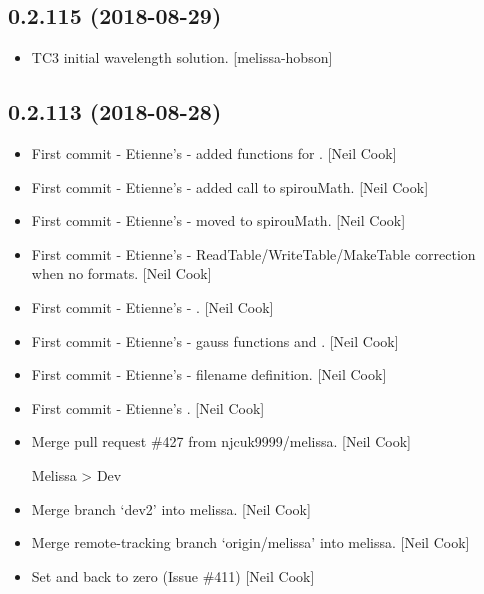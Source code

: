 \documentclass[a4paper,10pt,english]{report}
\begin{document}
\subsection{0.2.115 (2018-08-29)}
\label{\detokenize{misc/changelog:id346}}\begin{itemize}
\item {} 
TC3 initial wavelength solution. {[}melissa-hobson{]}

\end{itemize}


\subsection{0.2.113 (2018-08-28)}
\label{\detokenize{misc/changelog:id347}}\begin{itemize}
\item {} 
First commit - Etienne’s  - added functions for . {[}Neil
Cook{]}

\item {} 
First commit - Etienne’s  - added call to spirouMath. {[}Neil
Cook{]}

\item {} 
First commit - Etienne’s  - moved  to spirouMath. {[}Neil
Cook{]}

\item {} 
First commit - Etienne’s  - ReadTable/WriteTable/MakeTable
correction when no formats. {[}Neil Cook{]}

\item {} 
First commit - Etienne’s  - . {[}Neil Cook{]}

\item {} 
First commit - Etienne’s  - gauss functions and . {[}Neil
Cook{]}

\item {} 
First commit - Etienne’s  - filename definition. {[}Neil Cook{]}

\item {} 
First commit - Etienne’s . {[}Neil Cook{]}

\item {} 
Merge pull request \#427 from njcuk9999/melissa. {[}Neil Cook{]}

Melissa \textendash{}\textgreater{} Dev

\item {} 
Merge branch ‘dev2’ into melissa. {[}Neil Cook{]}

\item {} 
Merge remote-tracking branch ‘origin/melissa’ into melissa. {[}Neil
Cook{]}

\item {} 
Set  and  back to zero (Issue \#411)
{[}Neil Cook{]}

\end{itemize}
\end{document}
